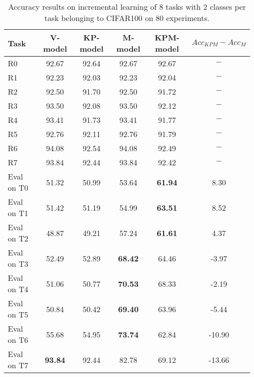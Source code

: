 \begin{table}[H]
\centering
\begin{tabular}{lccccc}
\toprule
Task  & V-model & KP-model & M-model & KPM-model & $Acc_{KPM}-Acc_{M}$ \\
\midrule
R0 & 92.67 & 92.64 & 92.67 & 92.67 & $-$ \\
R1 & 92.23 & 92.03 & 92.23 & 92.04 & $-$ \\
R2 & 92.50 & 91.70 & 92.50 & 91.72 & $-$ \\
R3 & 93.50 & 92.08 & 93.50 & 92.12 & $-$ \\
R4 & 93.41 & 91.73 & 93.41 & 91.77 & $-$ \\
R5 & 92.76 & 92.11 & 92.76 & 91.79 & $-$ \\
R6 & 94.08 & 92.54 & 94.08 & 92.49 & $-$ \\
R7 & 93.84 & 92.44 & 93.84 & 92.42 & $-$ \\

 \hline 
Eval on T0 & 51.32 & 50.99 & 53.64 & \textbf{61.94} & 8.30 \\
Eval on T1 & 51.42 & 51.19 & 54.99 & \textbf{63.51} & 8.52 \\
Eval on T2 & 48.87 & 49.21 & 57.24 & \textbf{61.61} & 4.37 \\
Eval on T3 & 52.49 & 52.89 & \textbf{68.42} & 64.46 & -3.97 \\
Eval on T4 & 51.06 & 50.77 & \textbf{70.53} & 68.33 & -2.19 \\
Eval on T5 & 50.84 & 50.42 & \textbf{69.40} & 63.96 & -5.44 \\
Eval on T6 & 55.68 & 54.95 & \textbf{73.74} & 62.84 & -10.90 \\
Eval on T7 & \textbf{93.84} & 92.44 & 82.78 & 69.12 & -13.66 \\
\bottomrule
\end{tabular}
\caption{Accuracy results on incremental learning of 8 tasks with 2 classes per task belonging to CIFAR100 on 80 experiments.}
\end{table}
